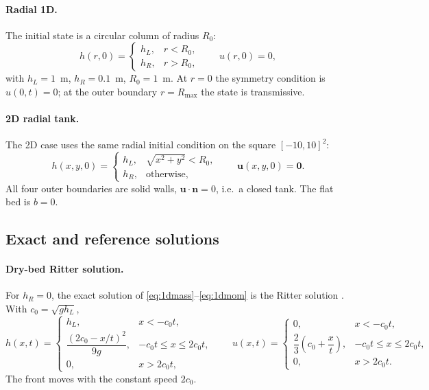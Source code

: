 ﻿\documentclass[11pt,a4paper]{article}
\newcommand{\bu}{\mathbf{u}}
\newcommand{\bn}{\mathbf{n}}
\begin{document}
\paragraph{Radial 1D.}
The initial state is a circular column of radius $R_0$:
\begin{equation}
  h(r,0)=
  \begin{cases}
    h_L,& r<R_0,\\
    h_R,& r>R_0,
  \end{cases}
  \qquad u(r,0)=0,
  \label{eq:icrad}
\end{equation}
with $h_L=1$~m, $h_R=0.1$~m, $R_0=1$~m.  At $r=0$ the symmetry condition is
$u(0,t)=0$; at the outer boundary $r=R_{\max}$ the state is transmissive.

\paragraph{2D radial tank.}
The 2D case uses the same radial initial condition on the square
$[-10,10]^2$:
\begin{equation}
  h(x,y,0)=
  \begin{cases}
    h_L,& \sqrt{x^2+y^2}<R_0,\\
    h_R,& \text{otherwise},
  \end{cases}
  \qquad \bu(x,y,0)=\mathbf{0}.
  \label{eq:ic2d}
\end{equation}
All four outer boundaries are solid walls, $\bu\cdot\bn=0$, i.e.\ a closed
tank.  The flat bed is $b=0$.

\subsection{Exact and reference solutions}
\paragraph{Dry-bed Ritter solution.}
For $h_R=0$, the exact solution of \eqref{eq:1dmass}--\eqref{eq:1dmom} is the
Ritter solution \cite{ritter1892}.  With $c_0=\sqrt{g h_L}$,
\begin{equation}
  h(x,t)=
  \begin{cases}
    h_L,& x<-c_0 t,\\[2pt]
    \dfrac{(2c_0-x/t)^2}{9g},& -c_0 t\le x\le 2c_0 t,\\[6pt]
    0,& x>2c_0 t,
  \end{cases}
  \qquad
  u(x,t)=
  \begin{cases}
    0,& x<-c_0 t,\\[2pt]
    \dfrac{2}{3}\left(c_0+\dfrac{x}{t}\right),& -c_0 t\le x\le 2c_0 t,\\[6pt]
    0,& x>2c_0 t .
  \end{cases}
  \label{eq:ritter}
\end{equation}
The front moves with the constant speed $2c_0$.
\end{document}
